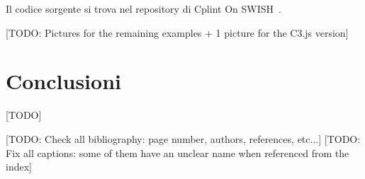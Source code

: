 \documentclass[10pt,titlepage,twoside,a4paper]{report}
\begin{document}
Il codice sorgente si trova nel repository di Cplint On 
SWISH~\cite{sevenScientistsRpl}.

[TODO: Pictures for the remaining examples + 1 picture for the C3.js version]



\chapter{Conclusioni}

[TODO]


[TODO: Check all bibliography: page number, authors, references, etc...]
[TODO: Fix all captions: some of them have an unclear name when referenced from 
       the index]

\printbibliography
\end{document}
